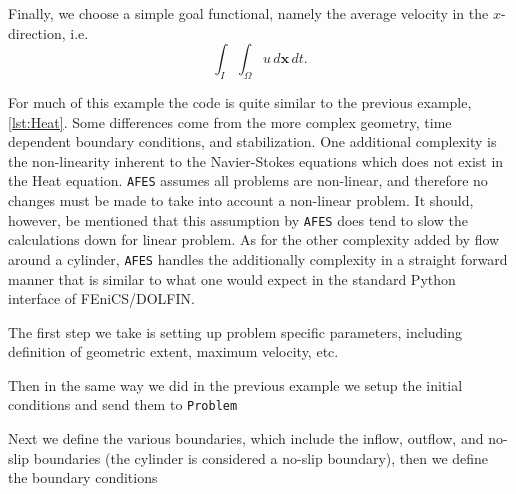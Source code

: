    Finally, we choose a simple goal functional, namely the average velocity in
    the $x$-direction, i.e.
    \begin{equation}
        \int_{I}\!\int_{\Omega} u\, d\mathbf{x}\,dt.
        \label{eq:NSEGoal}
    \end{equation}

    For much of this example the code is quite similar to the previous example,
    \autoref{lst:Heat}.  Some differences come from the more complex geometry,
    time dependent boundary conditions, and stabilization. One additional
    complexity is the non-linearity inherent to the Navier-Stokes equations
    which does not exist in the Heat equation. \texttt{AFES} assumes all problems are
    non-linear, and therefore no changes must be made to take into account a
    non-linear problem.  It should, however, be mentioned that this assumption
    by \texttt{AFES} does tend to slow the calculations down for linear problem. As for
    the other complexity added by flow around a cylinder, \texttt{AFES} handles the
    additionally complexity in a straight forward manner that is similar to what
    one would expect in the standard Python interface of FEniCS/DOLFIN.

    The first step we take is setting up problem specific parameters, including
    definition of geometric extent, maximum velocity, etc.
    
    
    Then in the same way we did in the previous example we setup the initial
    conditions and send them to \texttt{Problem}
    
    

    Next we define the various boundaries, which include the inflow, outflow,
    and no-slip boundaries (the cylinder is considered a no-slip boundary), then
    we define the boundary conditions
    
    

